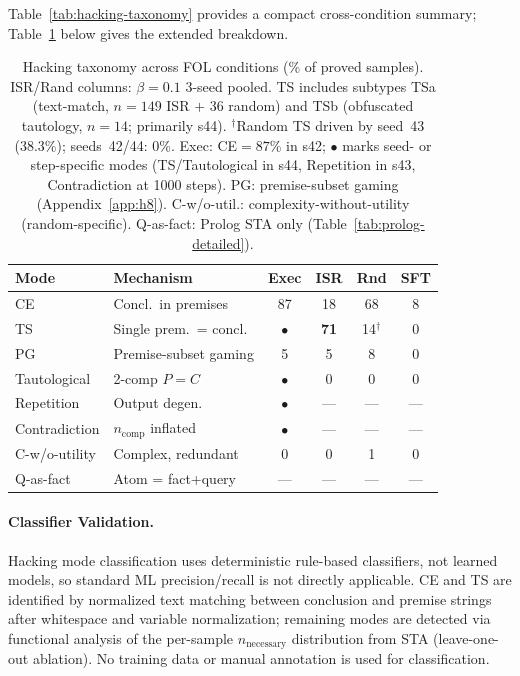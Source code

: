 Table~\ref{tab:hacking-taxonomy} provides a compact cross-condition summary; Table~\ref{tab:hacking-taxonomy-app} below gives the extended breakdown.

\begin{table}[ht]
\centering
\small
\begin{tabular}{@{}llcccc@{}}
\toprule
\textbf{Mode} & \textbf{Mechanism} & \textbf{Exec} & \textbf{ISR} & \textbf{Rnd} & \textbf{SFT} \\
\midrule
CE & Concl.\ in premises & 87 & 18 & 68 & 8 \\
TS & Single prem.\ = concl. & $\bullet$ & \textbf{71} & 14$^\dagger$ & 0 \\
PG & Premise-subset gaming & 5 & 5 & 8 & 0 \\
Tautological & 2-comp $P{=}C$ & $\bullet$ & 0 & 0 & 0 \\
Repetition & Output degen. & $\bullet$ & --- & --- & --- \\
Contradiction & $n_{\text{comp}}$ inflated & $\bullet$ & --- & --- & --- \\
C-w/o-utility & Complex, redundant & 0 & 0 & 1 & 0 \\
Q-as-fact & Atom = fact+query & --- & --- & --- & --- \\
\bottomrule
\end{tabular}
\caption{Hacking taxonomy across FOL conditions (\% of proved samples). ISR/Rand columns: $\beta{=}0.1$ 3-seed pooled. TS includes subtypes TSa (text-match, $n{=}149$ ISR $+$ 36 random) and TSb (obfuscated tautology, $n{=}14$; primarily s44). $^\dagger$Random TS driven by seed~43 (38.3\%); seeds~42/44: 0\%. Exec: CE${=}87$\% in s42; $\bullet$ marks seed- or step-specific modes (TS/Tautological in s44, Repetition in s43, Contradiction at 1000 steps). PG: premise-subset gaming (Appendix~\ref{app:h8}). C-w/o-util.: complexity-without-utility (random-specific). Q-as-fact: Prolog STA only (Table~\ref{tab:prolog-detailed}).}
\label{tab:hacking-taxonomy-app}
\end{table}

\paragraph{Classifier Validation.}
Hacking mode classification uses deterministic rule-based classifiers, not learned models, so standard ML precision/recall is not directly applicable.
CE and TS are identified by normalized text matching between conclusion and premise strings after whitespace and variable normalization; remaining modes are detected via functional analysis of the per-sample $n_{\text{necessary}}$ distribution from STA (leave-one-out ablation).
No training data or manual annotation is used for classification.


